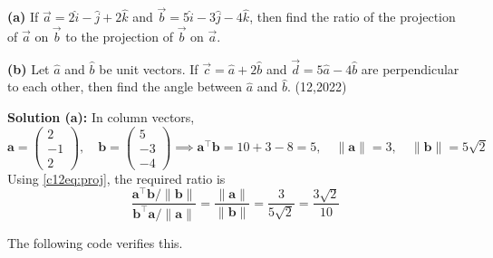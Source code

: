 \item \textbf{(a)} If $\vec{a} = 2\hat{i} - \hat{j} + 2\hat{k}$ and $\vec{b} = 5\hat{i} - 3\hat{j} - 4\hat{k}$, then find the ratio of the projection of $\vec{a}$ on $\vec{b}$ to the projection of $\vec{b}$ on $\vec{a}$.

\textbf{(b)} Let $\hat{a}$ and $\hat{b}$ be unit vectors. If $\vec{c} = \hat{a} + 2\hat{b}$ and $\vec{d} = 5\hat{a} - 4\hat{b}$ are perpendicular to each other, then find the angle between $\hat{a}$ and $\hat{b}$. \hfill (12,2022)

\textbf{Solution (a):} In column vectors,
\begin{equation}
\mathbf{a} = \begin{pmatrix} 2 \\ -1 \\ 2 \end{pmatrix}, \quad
\mathbf{b} = \begin{pmatrix} 5 \\ -3 \\ -4 \end{pmatrix}
\implies \mathbf{a}^{\top}\mathbf{b} = 10 + 3 - 8 = 5, \quad
\|\mathbf{a}\| = 3, \quad \|\mathbf{b}\| = 5\sqrt{2}
\end{equation}
Using \eqref{c12eq:proj}, the required ratio is
\begin{equation}
\frac{\mathbf{a}^{\top}\mathbf{b}/\|\mathbf{b}\|}{\mathbf{b}^{\top}\mathbf{a}/\|\mathbf{a}\|}
= \frac{\|\mathbf{a}\|}{\|\mathbf{b}\|} = \frac{3}{5\sqrt{2}} = \frac{3\sqrt{2}}{10}
\end{equation}

The following code verifies this.

\nopagebreak[4]
\begin{center}
\end{center}

